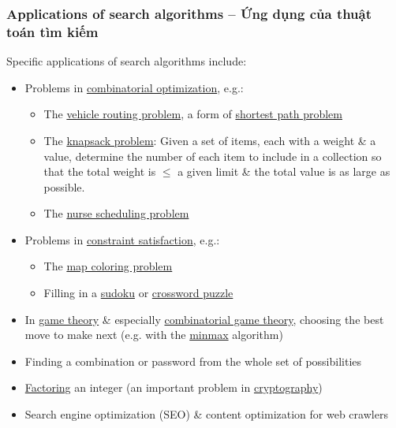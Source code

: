 \documentclass[oneside]{book}
\begin{document}
\subsubsection{Applications of search algorithms -- Ứng dụng của thuật toán tìm kiếm}
Specific applications of search algorithms include:
\begin{itemize}
	\item Problems in \href{https://en.wikipedia.org/wiki/Combinatorial_optimization}{combinatorial optimization}, e.g.:
	\begin{itemize}
		\item The \href{https://en.wikipedia.org/wiki/Vehicle_routing_problem}{vehicle routing problem}, a form of \href{https://en.wikipedia.org/wiki/Shortest_path_problem}{shortest path problem}
		\item The \href{https://en.wikipedia.org/wiki/Knapsack_problem}{knapsack problem}: Given a set of items, each with a weight \& a value, determine the number of each item to include in a collection so that the total weight is $\le$ a given limit \& the total value is as large as possible.
		\item The \href{https://en.wikipedia.org/wiki/Nurse_scheduling_problem}{nurse scheduling problem}
	\end{itemize}
	\item Problems in \href{https://en.wikipedia.org/wiki/Constraint_satisfaction}{constraint satisfaction}, e.g.:
	\begin{itemize}
		\item The \href{https://en.wikipedia.org/wiki/Map_coloring_problem}{map coloring problem}
		\item Filling in a \href{https://en.wikipedia.org/wiki/Sudoku}{sudoku} or \href{https://en.wikipedia.org/wiki/Crossword_puzzle}{crossword puzzle}
	\end{itemize}
	\item In \href{https://en.wikipedia.org/wiki/Game_theory}{game theory} \& especially \href{https://en.wikipedia.org/wiki/Combinatorial_game_theory}{combinatorial game theory}, choosing the best move to make next (e.g. with the \href{https://en.wikipedia.org/wiki/Minmax}{minmax} algorithm)
	\item Finding a combination or password from the whole set of possibilities
	\item \href{https://en.wikipedia.org/wiki/Factorization}{Factoring} an integer (an important problem in \href{https://en.wikipedia.org/wiki/Cryptography}{cryptography})
	\item Search engine optimization (SEO) \& content optimization for web crawlers

\end{itemize}
\end{document}
